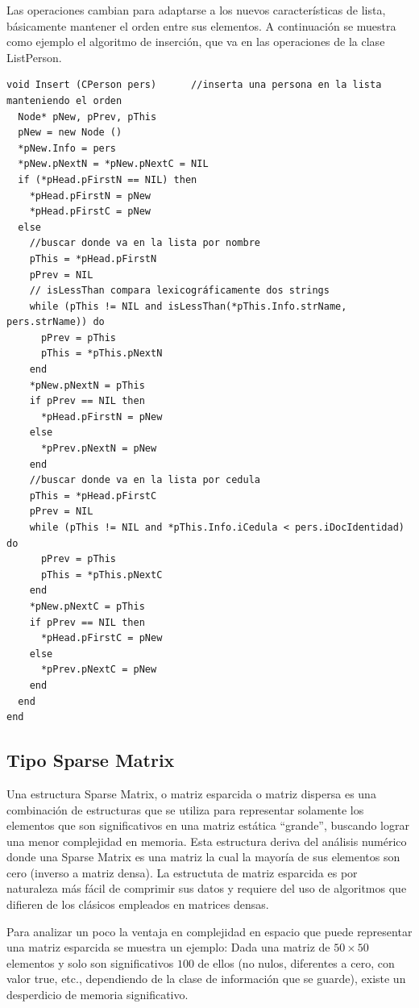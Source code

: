 Las operaciones cambian para adaptarse a los nuevos características de lista, básicamente mantener el orden entre sus elementos. A continuación se muestra como ejemplo el algoritmo de inserción, que va en las operaciones de la clase ListPerson.

\begin{lstlisting}[upquote=true, language=pseudo]
void Insert (CPerson pers)		//inserta una persona en la lista manteniendo el orden
  Node* pNew, pPrev, pThis
  pNew = new Node ()
  *pNew.Info = pers
  *pNew.pNextN = *pNew.pNextC = NIL
  if (*pHead.pFirstN == NIL) then
    *pHead.pFirstN = pNew
    *pHead.pFirstC = pNew
  else
    //buscar donde va en la lista por nombre
    pThis = *pHead.pFirstN
    pPrev = NIL
    // isLessThan compara lexicográficamente dos strings
    while (pThis != NIL and isLessThan(*pThis.Info.strName, pers.strName)) do
      pPrev = pThis
      pThis = *pThis.pNextN
    end
    *pNew.pNextN = pThis
    if pPrev == NIL then
      *pHead.pFirstN = pNew
    else
      *pPrev.pNextN = pNew
    end
    //buscar donde va en la lista por cedula
    pThis = *pHead.pFirstC
    pPrev = NIL
    while (pThis != NIL and *pThis.Info.iCedula < pers.iDocIdentidad) do
      pPrev = pThis
      pThis = *pThis.pNextC
    end
    *pNew.pNextC = pThis
    if pPrev == NIL then
      *pHead.pFirstC = pNew
    else
      *pPrev.pNextC = pNew
    end
  end
end
\end{lstlisting}
\subsection{Tipo Sparse Matrix}

Una estructura Sparse Matrix, o matriz esparcida o matriz dispersa es una combinación de estructuras que se utiliza para representar solamente los elementos que son significativos en una matriz estática “grande”, buscando lograr una menor complejidad en memoria. Esta estructura deriva del análisis numérico donde una Sparse Matrix es una matriz la cual la mayoría de sus elementos son cero (inverso a matriz densa). La estructuta de matriz esparcida es por naturaleza más fácil de comprimir sus datos y requiere del uso de algoritmos que difieren de los clásicos empleados en matrices densas.

Para analizar un poco la ventaja en complejidad en espacio que puede representar una matriz esparcida se muestra un ejemplo: Dada una matriz de $50 \times 50$ elementos y solo son significativos $100$ de ellos (no nulos, diferentes a cero, con valor true, etc., dependiendo de la clase de información que se guarde), existe un desperdicio de memoria significativo.

